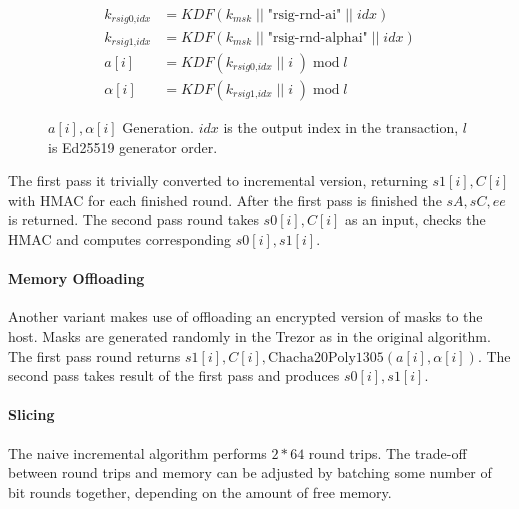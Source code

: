 \documentclass[]{article}
\begin{document}
\begin{figure}[H]

	\begin{equation}
	\begin{split}
	k_{\textit{rsig0,idx}} &= \textit{KDF}\left(k_{msk} \; || \; \text{"rsig-rnd-ai"} \; || \; idx \right)\\
	k_{\textit{rsig1,idx}} &= \textit{KDF}\left(k_{msk} \; || \; \text{"rsig-rnd-alphai"} \; || \; idx \right)\\
	a[i] &= \textit{KDF}(k_{\textit{rsig0,idx}} \; || \; i \; ) \; \text{mod} \; l  \\
	\alpha[i] &= \textit{KDF}(k_{\textit{rsig1,idx}} \; || \; i \; ) \; \text{mod} \; l
	\end{split}
	\end{equation}

	\caption{$a[i], \alpha[i]$ Generation. $idx$ is the output index in the transaction, $l$ is Ed25519 generator order.} \label{eq:masks}
\end{figure}

The first pass it trivially converted to incremental version, returning $s1[i], C[i]$ with HMAC for each finished round. 
After the first pass is finished the $sA, sC, ee$ is returned. The second pass round takes $s0[i], C[i]$ as an input, checks the HMAC and computes corresponding $s0[i], s1[i]$. 


\paragraph{Memory Offloading}
Another variant makes use of offloading an encrypted version of masks to the host.
Masks are generated randomly in the Trezor as in the original algorithm.
The first pass round returns $s1[i], C[i], \text{Chacha20Poly1305}(a[i], \alpha[i])$.
The second pass takes result of the first pass and produces $s0[i], s1[i]$.

\paragraph{Slicing} 
The naive incremental algorithm performs $2 * 64$ round trips. The trade-off between round trips and memory can be adjusted by batching some number of bit rounds together, depending on the amount of free memory. 
\end{document}
